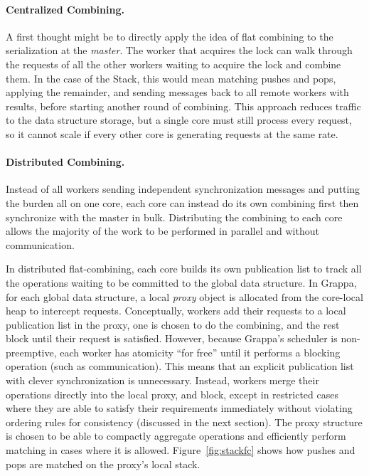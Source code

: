 \paragraph{Centralized Combining.}
A first thought might be to directly apply the idea of flat combining to the serialization at the \emph{master}. The worker that acquires the lock can walk through the requests of all the other workers waiting to acquire the lock and combine them. In the case of the Stack, this would mean matching pushes and pops, applying the remainder, and sending messages back to all remote workers with results, before starting another round of combining. This approach reduces traffic to the data structure storage, but a single core must still process every request, so it cannot scale if every other core is generating requests at the same rate.

\paragraph{Distributed Combining.}
Instead of all workers sending independent synchronization messages and putting the burden all on one core, each core can instead do its own combining first then synchronize with the master in bulk.
Distributing the combining to each core allows the majority of the work to be performed in parallel and without communication.


In distributed flat-combining, each core builds its own publication list to track all the operations waiting to be committed to the global data structure.
In Grappa, for each global data structure, a local \emph{proxy} object is allocated from the core-local heap to intercept requests.
Conceptually, workers add their requests to a local publication list in the proxy, one is chosen to do the combining, and the rest block until their request is satisfied.
However, because Grappa's scheduler is non-preemptive, each worker has atomicity ``for free'' until it performs a blocking operation (such as communication).
This means that an explicit publication list with clever synchronization is unnecessary.
Instead, workers merge their operations directly into the local proxy, and 
block, except in restricted cases where they are able to satisfy their requirements immediately without violating ordering rules for consistency (discussed in the next section).
The proxy structure is chosen to be able to compactly aggregate operations and efficiently perform matching in cases where it is allowed. Figure~\ref{fig:stackfc} shows how pushes and pops are matched on the proxy's local stack.

